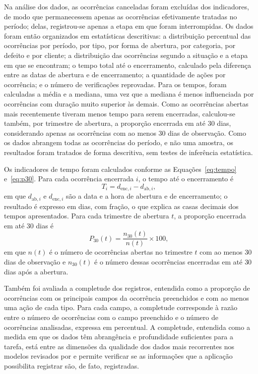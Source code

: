 Na análise dos dados, as ocorrências canceladas foram excluídas dos indicadores, de modo que permanecessem apenas as ocorrências efetivamente tratadas no período; delas, registrou-se apenas a etapa em que foram interrompidas. Os dados foram então organizados em estatísticas descritivas: a distribuição percentual das ocorrências por período, por tipo, por forma de abertura, por categoria, por defeito e por cliente; a distribuição das ocorrências segundo a situação e a etapa em que se encontram; o tempo total até o encerramento, calculado pela diferença entre as datas de abertura e de encerramento; a quantidade de ações por ocorrência; e o número de verificações reprovadas. Para os tempos, foram calculadas a média e a mediana, uma vez que a mediana é menos influenciada por ocorrências com duração muito superior às demais. Como as ocorrências abertas mais recentemente tiveram menos tempo para serem encerradas, calculou-se também, por trimestre de abertura, a proporção encerrada em até 30 dias, considerando apenas as ocorrências com ao menos 30 dias de observação. Como os dados abrangem todas as ocorrências do período, e não uma amostra, os resultados foram tratados de forma descritiva, sem testes de inferência estatística.

Os indicadores de tempo foram calculados conforme as Equações~\eqref{eq:tempo} e~\eqref{eq:p30}. Para cada ocorrência encerrada $i$, o tempo até o encerramento é
\begin{equation}
    T_i = d_{\mathrm{enc},i} - d_{\mathrm{ab},i},
    \label{eq:tempo}
\end{equation}
em que $d_{\mathrm{ab},i}$ e $d_{\mathrm{enc},i}$ são a data e a hora de abertura e de encerramento; o resultado é expresso em dias, com fração, o que explica as casas decimais dos tempos apresentados. Para cada trimestre de abertura $t$, a proporção encerrada em até 30 dias é
\begin{equation}
    P_{30}(t) = \frac{n_{30}(t)}{n(t)} \times 100,
    \label{eq:p30}
\end{equation}
em que $n(t)$ é o número de ocorrências abertas no trimestre $t$ com ao menos 30 dias de observação e $n_{30}(t)$ é o número dessas ocorrências encerradas em até 30 dias após a abertura.

Também foi avaliada a completude dos registros, entendida como a proporção de ocorrências com os principais campos da ocorrência preenchidos e com ao menos uma ação de cada tipo. Para cada campo, a completude corresponde à razão entre o número de ocorrências com o campo preenchido e o número de ocorrências analisadas, expressa em percentual. A completude, entendida como a medida em que os dados têm abrangência e profundidade suficientes para a tarefa, está entre as dimensões da qualidade dos dados mais recorrentes nos modelos revisados por  e permite verificar se as informações que a aplicação possibilita registrar são, de fato, registradas.


